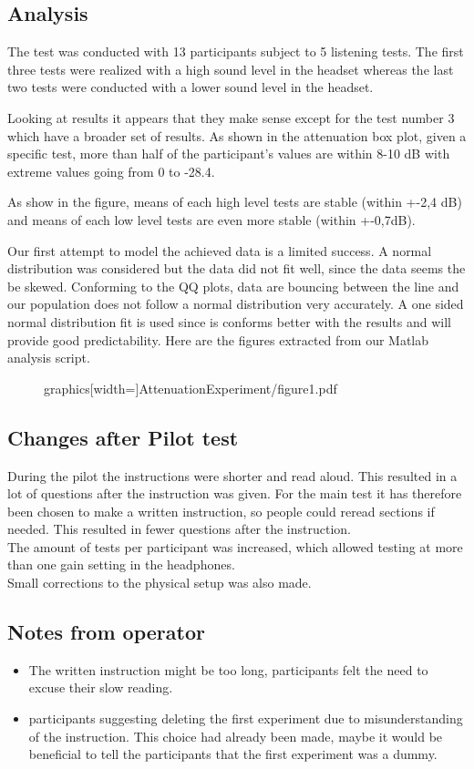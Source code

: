 \subsection{Analysis}

The test was conducted with 13 participants subject to 5 listening tests. The first three tests were realized with a high sound level in the headset whereas the last two tests were conducted with a lower sound level in the headset. 

Looking at results it appears that they make sense except for the test number 3 which have a broader set of results. As shown in the attenuation box plot, given a specific test, more than half of the participant's values are within 8-10 dB with extreme values going from 0 to -28.4.

As show in the figure, means of each high level tests are stable (within +-2,4 dB) and means of each low level tests are even more stable (within +-0,7dB). 

Our first attempt to model the achieved data is a limited success. A normal distribution was considered but the data did not fit well, since the data seems the be skewed. Conforming to the QQ plots, data are bouncing between the line and our population does not follow a normal distribution very accurately. A one sided normal distribution fit is used since is conforms better with the results and will provide good predictability. Here are the figures extracted from our Matlab analysis script.


\begin{figure}[H]
	
	graphics[width=\textwidth]{AttenuationExperiment/figure1.pdf}
\end{figure}

\subsection{Changes after Pilot test}
During the pilot the instructions were shorter and read aloud. This resulted in a lot of questions after the instruction was given. For the main test it has therefore been chosen to make a written instruction, so people could reread sections if needed. This resulted in fewer questions after the instruction. \\
The amount of tests per participant was increased, which allowed testing at more than one gain setting in the headphones. \\
Small corrections to the physical setup was also made. 

\subsection{Notes from operator}
\begin{itemize}
\item The written instruction might be too long, participants felt the need to excuse their slow reading.
\item participants suggesting deleting the first experiment due to misunderstanding of the instruction. This choice had already been made, maybe it would be beneficial to tell the participants that the first experiment was a dummy. 
\end{itemize}

